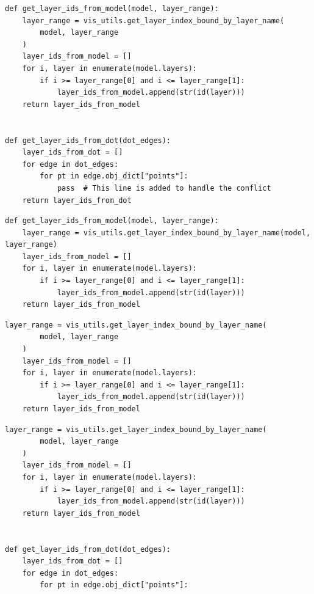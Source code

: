 \begin{lstlisting}[style=conflictcode,title={\textbf{Apertus-8B, without the skill} --- edit 0.368, winnowing 0.620, 597 characters}]
def get_layer_ids_from_model(model, layer_range):
    layer_range = vis_utils.get_layer_index_bound_by_layer_name(
        model, layer_range
    )
    layer_ids_from_model = []
    for i, layer in enumerate(model.layers):
        if i >= layer_range[0] and i <= layer_range[1]:
            layer_ids_from_model.append(str(id(layer)))
    return layer_ids_from_model


def get_layer_ids_from_dot(dot_edges):
    layer_ids_from_dot = []
    for edge in dot_edges:
        for pt in edge.obj_dict["points"]:
            pass  # This line is added to handle the conflict
    return layer_ids_from_dot
\end{lstlisting}

\begin{lstlisting}[style=conflictcode,title={\textbf{Apertus-8B, with v2.1 in the system prompt} --- edit 0.584, winnowing 0.769, 352 characters}]
def get_layer_ids_from_model(model, layer_range):
    layer_range = vis_utils.get_layer_index_bound_by_layer_name(model, layer_range)
    layer_ids_from_model = []
    for i, layer in enumerate(model.layers):
        if i >= layer_range[0] and i <= layer_range[1]:
            layer_ids_from_model.append(str(id(layer)))
    return layer_ids_from_model
\end{lstlisting}

\begin{lstlisting}[style=conflictcode,title={\textbf{Qwen3-8B, without the skill} --- edit 0.672, winnowing 0.765, 312 characters}]
layer_range = vis_utils.get_layer_index_bound_by_layer_name(
        model, layer_range
    )
    layer_ids_from_model = []
    for i, layer in enumerate(model.layers):
        if i >= layer_range[0] and i <= layer_range[1]:
            layer_ids_from_model.append(str(id(layer)))
    return layer_ids_from_model
\end{lstlisting}

\begin{lstlisting}[style=conflictcode,title={\textbf{Qwen3-8B, with v2.1 in the system prompt} --- edit 0.466, winnowing 0.652, 451 characters}]
layer_range = vis_utils.get_layer_index_bound_by_layer_name(
        model, layer_range
    )
    layer_ids_from_model = []
    for i, layer in enumerate(model.layers):
        if i >= layer_range[0] and i <= layer_range[1]:
            layer_ids_from_model.append(str(id(layer)))
    return layer_ids_from_model


def get_layer_ids_from_dot(dot_edges):
    layer_ids_from_dot = []
    for edge in dot_edges:
        for pt in edge.obj_dict["points"]:
\end{lstlisting}


